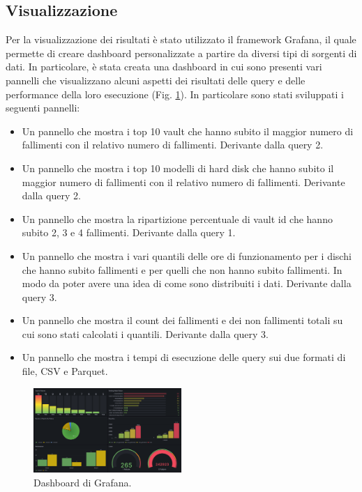 \documentclass[conference]{IEEEtran}
\begin{document}
\subsection{Visualizzazione}
Per la visualizzazione dei risultati è stato utilizzato il framework Grafana, il quale permette di creare dashboard personalizzate a partire da diversi tipi di sorgenti di dati. In particolare, è stata creata una dashboard in cui sono presenti vari pannelli che visualizzano alcuni aspetti dei risultati delle query e delle performance della loro esecuzione (Fig. \ref{fig:grafana_dashboard}).
In particolare sono stati sviluppati i seguenti pannelli:
\begin{itemize}
    \item Un pannello che mostra i top 10 vault che hanno subito il maggior numero di fallimenti con il relativo numero di fallimenti. Derivante dalla query 2.
    \item Un pannello che mostra i top 10 modelli di hard disk che hanno subito il maggior numero di fallimenti con il relativo numero di fallimenti. Derivante dalla query 2.
    \item Un pannello che mostra la ripartizione percentuale di vault id che hanno subito 2, 3 e 4 fallimenti. Derivante dalla query 1.
    \item Un pannello che mostra i vari quantili delle ore di funzionamento per i dischi che hanno subito fallimenti e per quelli che non hanno subito fallimenti. In modo da poter avere una idea di come sono distribuiti i dati. Derivante dalla query 3.
    \item Un pannello che mostra il count dei fallimenti e dei non fallimenti totali su cui sono stati calcolati i quantili. Derivante dalla query 3.
    \item Un pannello che mostra i tempi di esecuzione delle query sui due formati di file, CSV e Parquet.
\end{itemize}
\begin{figure}[H]
    \centerline{\includegraphics[width=0.5\textwidth]{res/grafana_dashboard.png}}
    \caption{Dashboard di Grafana.}
    \label{fig:grafana_dashboard}
\end{figure}
\end{document}

